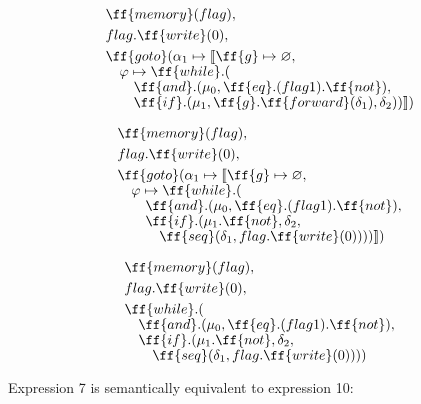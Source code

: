 \documentclass[sigplan,review,11pt,nonacm,natbib=false]{acmart}
\newcommand\br{\\[-4pt]}
\begin{document}
\begin{equation}
\begin{split}
& \ff{memory}(flag), \\
& flag.\ff{write}(0), \\
& \ff{goto} ( \alpha_1 \mapsto \llbracket \ff{g} \mapsto \varnothing, \br
& \quad \varphi \mapsto \ff{while}.(\br
& \quad \quad \ff{and}.( \mu_0, \ff{eq}.(flag  1).\ff{not}), \br
& \quad \quad \ff{if}.(\mu_1,  \ff{g}.\ff{forward}(\delta_1), \delta_2) )\rrbracket)\\[-1pt]
\end{split}
\end{equation}

\begin{equation}
\begin{split}
& \ff{memory}(flag), \\
& flag.\ff{write}(0), \\
& \ff{goto} ( \alpha_1 \mapsto \llbracket \ff{g} \mapsto \varnothing, \br
& \quad \varphi \mapsto \ff{while}.(\br
& \quad \quad \ff{and}.( \mu_0, \ff{eq}.(flag  1).\ff{not}), \br
& \quad \quad \ff{if}.(\mu_1.\ff{not}, \delta_2, \br
& \quad \quad \quad \ff{seq}( \delta_1, flag.\ff{write}(0) ) ) ) \rrbracket )\\[-1pt]
\end{split}
\end{equation}

\begin{equation}
\begin{split}
& \ff{memory}(flag), \\
& flag.\ff{write}(0), \\
& \ff{while}.(\br
& \quad \ff{and}.(\mu_0, \ff{eq}.(flag  1).\ff{not}), \br
& \quad \ff{if}.(\mu_1.\ff{not}, \delta_2, \br
& \quad \quad \ff{seq}( \delta_1, flag.\ff{write}(0) ) ) ) \\[-1pt]
\end{split}
\end{equation}

\begin{theorem}
Expression 7 is semantically equivalent to expression 10:
\end{theorem}
\end{document}
